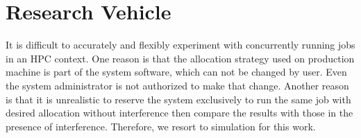 \documentclass[conference]{IEEEtran}
\begin{document}


%
%
%       






\section{Research Vehicle}
\label{sec:codes}

It is difficult to accurately and flexibly experiment with concurrently running jobs in an HPC context. One reason is that the allocation strategy used on production machine is part of the system software, which can not be changed by user. Even the system administrator is not authorized to make that change. Another reason is that it is unrealistic to reserve the system exclusively to run the same job with desired allocation without interference then compare the results with those in the presence of interference. Therefore, we resort to simulation for this work.
\end{document}
